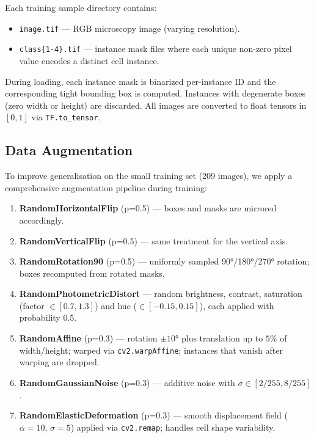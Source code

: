 \documentclass[11pt]{article}
\begin{document}
Each training sample directory contains:
\begin{itemize}[noitemsep]
  \item \texttt{image.tif} — RGB microscopy image (varying resolution).
  \item \texttt{class\{1-4\}.tif} — instance mask files where each unique
        non-zero pixel value encodes a distinct cell instance.
\end{itemize}

During loading, each instance mask is binarized per-instance ID and the
corresponding tight bounding box is computed. Instances with
degenerate boxes (zero width or height) are discarded. All images are
converted to float tensors in $[0, 1]$ via \texttt{TF.to\_tensor}.

\subsection{Data Augmentation}

To improve generalisation on the small training set (209 images), we
apply a comprehensive augmentation pipeline during training:

\begin{enumerate}[noitemsep]
  \item \textbf{RandomHorizontalFlip} (p=0.5) — boxes and masks are
        mirrored accordingly.
  \item \textbf{RandomVerticalFlip} (p=0.5) — same treatment for the
        vertical axis.
  \item \textbf{RandomRotation90} (p=0.5) — uniformly sampled 90°/180°/270°
        rotation; boxes recomputed from rotated masks.
  \item \textbf{RandomPhotometricDistort} — random brightness, contrast,
        saturation (factor $\in [0.7, 1.3]$) and hue ($\in [-0.15, 0.15]$),
        each applied with probability 0.5.
  \item \textbf{RandomAffine} (p=0.3) — rotation $\pm10°$ plus translation
        up to $5\%$ of width/height; warped via \texttt{cv2.warpAffine};
        instances that vanish after warping are dropped.
  \item \textbf{RandomGaussianNoise} (p=0.3) — additive noise with
        $\sigma \in [2/255, 8/255]$.
  \item \textbf{RandomElasticDeformation} (p=0.3) — smooth displacement
        field ($\alpha=10$, $\sigma=5$) applied via
        \texttt{cv2.remap}; handles cell shape variability.
\end{enumerate}
\end{document}

